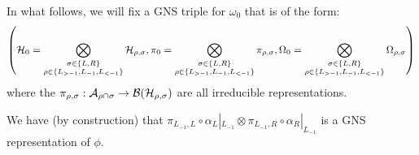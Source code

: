 \documentclass[11pt,a4paper,twoside]{article}
\numberwithin{equation}{section}
\begin{document}
	In what follows, we will fix a GNS triple for $\omega_0$ that is of the form:
	\begin{equation}
		\left(\HH_0=\bigotimes_{\substack{\sigma\in\{L,R\}\\ \rho\in\{L_{>-1},L_{-1},L_{<-1}\}}}\HH_{\rho,\sigma},\pi_0=\bigotimes_{\substack{\sigma\in\{L,R\}\\ \rho\in\{L_{>-1},L_{-1},L_{<-1}\}}}\pi_{\rho,\sigma},\Omega_0=\bigotimes_{\substack{\sigma\in\{L,R\}\\ \rho\in\{L_{>-1},L_{-1},L_{<-1}\}}}\Omega_{\rho,\sigma}\right)
	\end{equation}
	where the $\pi_{\rho,\sigma}:\mathcal A_{\rho\cap\sigma}\rightarrow\mathcal B(\mathcal H_{\rho,\sigma})$ are all irreducible representations.
	\begin{remark}\label{rem:GNS_One_Dimensional}
		We have (by construction) that $\pi_{L_{-1},L}\circ\alpha_L|_{L_{-1}}\otimes \pi_{L_{-1},R}\circ\alpha_R|_{L_{-1}}$ is a GNS representation of $\phi$. 
	\end{remark}
\end{document}
